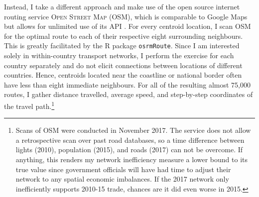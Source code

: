 \documentclass[11pt, oneside]{article}   	%
\begin{document}
Instead, I take a different approach and make use of the open source internet routing service \textsc{Open Street Map} (OSM), which is comparable to Google Maps but allows for unlimited use of its API \citep{OpenStreetMap__2017}. For every centroid location, I scan OSM for the optimal route to each of their respective eight surrounding neighbours. This is greatly facilitated by the R package \texttt{osrmRoute}. Since I am interested solely in within-country transport networks, I perform the exercise for each country separately and do not elicit connections between locations of different countries. Hence, centroids located near the coastline or national border often have less than eight immediate neighbours. For all of the resulting almost 75,000 routes, I gather distance travelled, average speed, and step-by-step coordinates of the travel path.\footnote{Scans of OSM were conducted in November 2017. The service does not allow a retrospective scan over past road databases, so a time difference between lights (2010), population (2015), and roads (2017) can not be overcome. If anything, this renders my network inefficiency measure a lower bound to its true value since government officials will have had time to adjust their network to any spatial economic imbalances. If the 2017 network only inefficiently supports 2010-15 trade, chances are it did even worse in 2015.}
\end{document}
